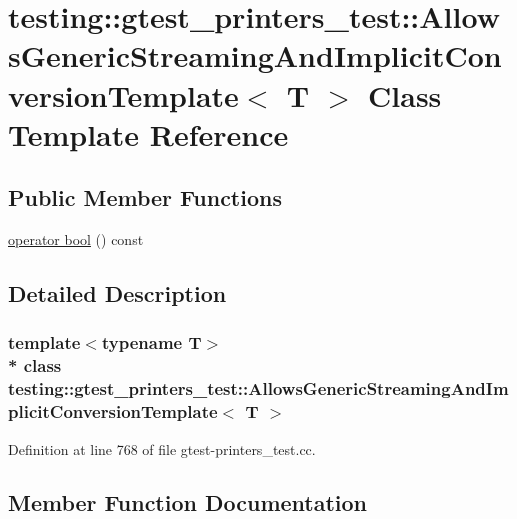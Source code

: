 \hypertarget{classtesting_1_1gtest__printers__test_1_1_allows_generic_streaming_and_implicit_conversion_template}{}\section{testing\+:\+:gtest\+\_\+printers\+\_\+test\+:\+:Allows\+Generic\+Streaming\+And\+Implicit\+Conversion\+Template$<$ T $>$ Class Template Reference}
\label{classtesting_1_1gtest__printers__test_1_1_allows_generic_streaming_and_implicit_conversion_template}
\subsection*{Public Member Functions}
\begin{DoxyCompactItemize}
\item 
\hyperlink{classtesting_1_1gtest__printers__test_1_1_allows_generic_streaming_and_implicit_conversion_template_a149a95a572a5ef546d852ba012c6226c}{operator bool} () const 
\end{DoxyCompactItemize}


\subsection{Detailed Description}
\subsubsection*{template$<$typename T$>$\\*
class testing\+::gtest\+\_\+printers\+\_\+test\+::\+Allows\+Generic\+Streaming\+And\+Implicit\+Conversion\+Template$<$ T $>$}



Definition at line 768 of file gtest-\/printers\+\_\+test.\+cc.



\subsection{Member Function Documentation}
